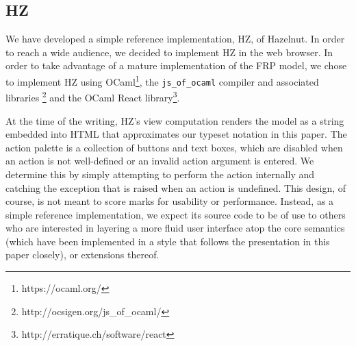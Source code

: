 \subsection{HZ}
We have developed a simple reference implementation, HZ, of Hazelnut.
In order to reach a wide audience, we decided to implement HZ in the web browser.
In order to take advantage of a mature implementation of the FRP model, we chose to implement HZ using OCaml\footnote{https://ocaml.org/}, the \texttt{js\_of\_ocaml} compiler and associated libraries \cite{DBLP:conf/ml/Balat06}\footnote{http://ocsigen.org/js\_of\_ocaml/} and the OCaml React library\footnote{http://erratique.ch/software/react}.

At the time of the writing, 
HZ's view computation renders the model as a string embedded into HTML that approximates our typeset notation in this paper. The action palette is a collection of buttons and text boxes, which are disabled when an action is not well-defined or an invalid action argument is entered. We determine this by simply attempting to perform the action internally and catching the exception that is raised when an action is undefined. This design, of course, is not meant to score marks for usability or performance. Instead, as a simple reference implementation, we expect its source code to be of use to others who are interested in layering a more fluid user interface atop the core semantics (which have been implemented in a style that follows the presentation in this paper closely), or extensions thereof.
